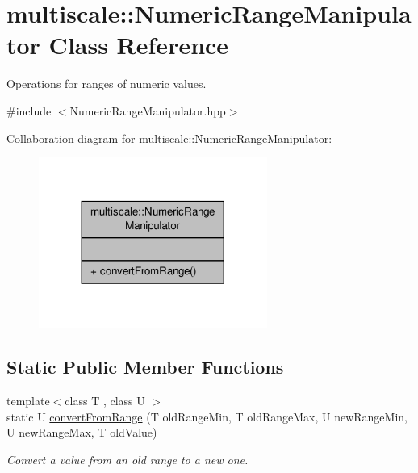 \hypertarget{classmultiscale_1_1NumericRangeManipulator}{\section{multiscale\-:\-:Numeric\-Range\-Manipulator Class Reference}
\label{classmultiscale_1_1NumericRangeManipulator}
}


Operations for ranges of numeric values.  




{\ttfamily \#include $<$Numeric\-Range\-Manipulator.\-hpp$>$}



Collaboration diagram for multiscale\-:\-:Numeric\-Range\-Manipulator\-:\nopagebreak
\begin{figure}[H]
\begin{center}
\leavevmode
\includegraphics[width=212pt]{classmultiscale_1_1NumericRangeManipulator__coll__graph}
\end{center}
\end{figure}
\subsection*{Static Public Member Functions}
\begin{DoxyCompactItemize}
\item 
{\footnotesize template$<$class T , class U $>$ }\\static U \hyperlink{classmultiscale_1_1NumericRangeManipulator_a4459c449fb7ebc07bcb8934d3a860e7e}{convert\-From\-Range} (T old\-Range\-Min, T old\-Range\-Max, U new\-Range\-Min, U new\-Range\-Max, T old\-Value)
\begin{DoxyCompactList}\small\item\em Convert a value from an old range to a new one. \end{DoxyCompactList}\end{DoxyCompactItemize}


